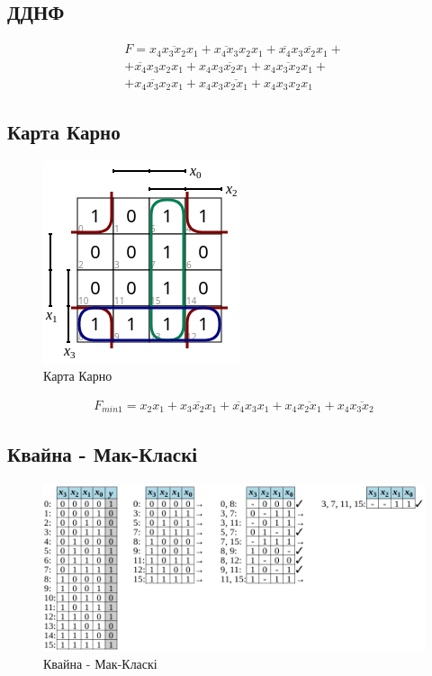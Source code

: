 \documentclass{article}
\begin{document}
\begin{normalsize}
	\subsection*{ДДНФ}
	\begin{Large}
		\begin{gather}
			F=\overline{x_4x_3x_2x_1}+\overline{x_4x_3}x_2x_1+\overline{x_4}x_3\overline{x_2}x_1+\nonumber\\
			+\overline{x_4}x_3x_2x_1+x_4\overline{x_3x_2x_1}+x_4\overline{x_3x_2}x_1+\nonumber\\
			+x_4\overline{x_3}x_2x_1+
			x_4x_3\overline{x_2x_1}+
			x_4x_3x_2x_1\nonumber
		\end{gather}
	\end{Large}
	
	\subsection*{Карта Карно}
	\begin{figure}[H]
		\centering
		\includegraphics[scale=0.7]{r1}
		\caption{Карта Карно}
	\end{figure}

	\begin{Large}
		\begin{gather}
			F_{min1}=x_2x_1+\overline{x_3x_2x_1}+\overline{x_4}x_3x_1+x_4\overline{x_2x_1}+x_4\overline{x_3x_2}\nonumber
		\end{gather}
	\end{Large}

	\subsection*{Квайна - Мак-Класкі}
	\begin{figure}[H]
		\centering
		\includegraphics[scale=0.52]{r2}
		\caption{Квайна - Мак-Класкі}
	\end{figure}


\end{normalsize}
\end{document}
